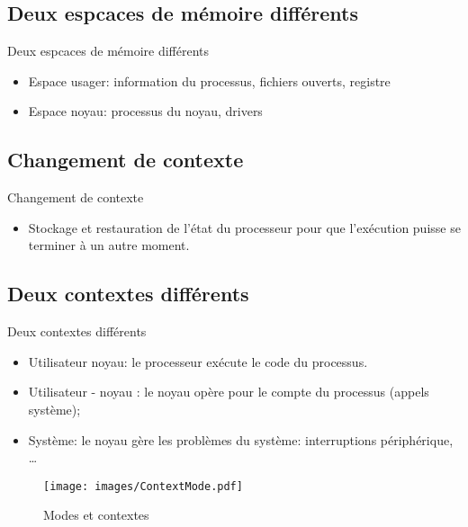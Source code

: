 \begin{frame}{\sectitle}
\def\subsectitle{Deux espcaces de mémoire différents}
\subsection{\subsectitle}

\begin{block}{\subsectitle}
\begin{itemize}
    \item Espace usager: information du processus, fichiers ouverts, registre
    \item Espace noyau: processus du noyau, drivers
\end{itemize}
\end{block}


\def\subsectitle{Changement de contexte}
\subsection{\subsectitle}

\begin{alertblock}{\subsectitle}
\begin{itemize}
    \item Stockage et restauration de l'état du processeur pour que l'exécution
        puisse se terminer à un autre moment.
\end{itemize}
\end{alertblock}

\def\subsectitle{Deux contextes différents}
\subsection{\subsectitle}

\begin{block}{\subsectitle}
\begin{itemize}
    \item Utilisateur noyau: le processeur exécute le code du processus.
    \item Utilisateur - noyau : le noyau opère pour le compte du processus
        (appels système);
    \item Système: le noyau gère les problèmes du système: interruptions
    périphérique, \dots
\end{itemize}
\end{block}
\end{frame}

\begin{frame}{\sectitle}
\begin{figure}
\texttt{[image: images/ContextMode.pdf]}
\caption{Modes et contextes}
\end{figure}
\end{frame}


